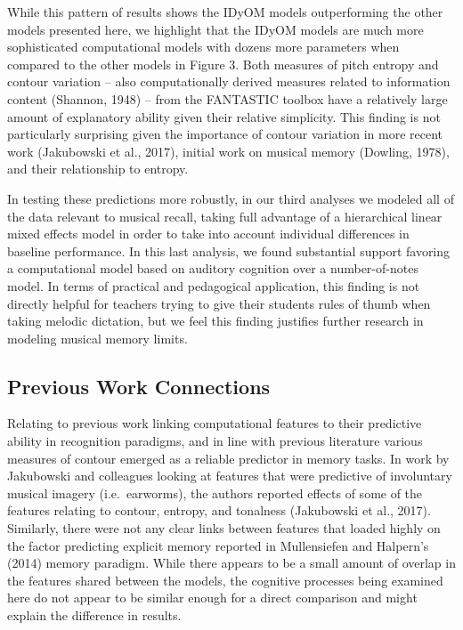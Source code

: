\documentclass[english,man,floatsintext]{apa6}
\begin{document}
While this pattern of results shows the IDyOM models outperforming the other models presented here, we highlight that the IDyOM models are much more sophisticated computational models with dozens more parameters when compared to the other models in Figure 3.
Both measures of pitch entropy and contour variation -- also computationally derived measures related to information content (Shannon, 1948) -- from the FANTASTIC toolbox have a relatively large amount of explanatory ability given their relative simplicity.
This finding is not particularly surprising given the importance of contour variation in more recent work (Jakubowski et al., 2017), initial work on musical memory (Dowling, 1978), and their relationship to entropy.

In testing these predictions more robustly, in our third analyses we modeled all of the data relevant to musical recall, taking full advantage of a hierarchical linear mixed effects model in order to take into account individual differences in baseline performance.
In this last analysis, we found substantial support favoring a computational model based on auditory cognition over a number-of-notes model.
In terms of practical and pedagogical application, this finding is not directly helpful for teachers trying to give their students rules of thumb when taking melodic dictation, but we feel this finding justifies further research in modeling musical memory limits.

\hypertarget{previous-work-connections}{%
\subsection{Previous Work Connections}\label{previous-work-connections}}

Relating to previous work linking computational features to their predictive ability in recognition paradigms, and in line with previous literature various measures of contour emerged as a reliable predictor in memory tasks.
In work by Jakubowski and colleagues looking at features that were predictive of involuntary musical imagery (i.e.~earworms), the authors reported effects of some of the features relating to contour, entropy, and tonalness (Jakubowski et al., 2017).
Similarly, there were not any clear links between features that loaded highly on the factor predicting explicit memory reported in Mullensiefen and Halpern's (2014) memory paradigm.
While there appears to be a small amount of overlap in the features shared between the models, the cognitive processes being examined here do not appear to be similar enough for a direct comparison and might explain the difference in results.
\end{document}
